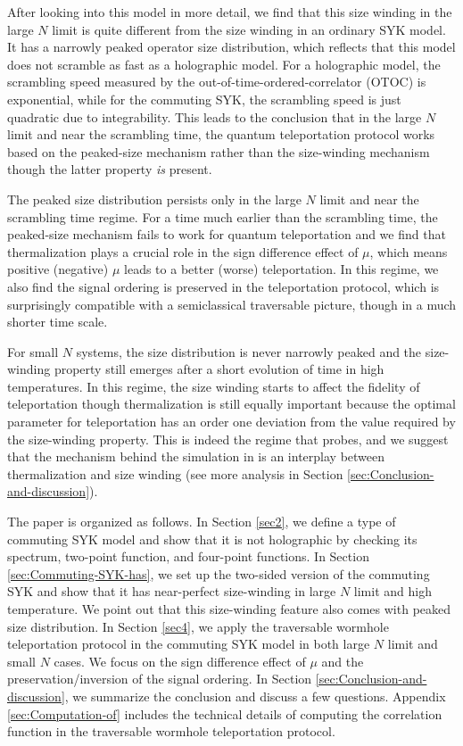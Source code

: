 \documentclass[11pt]{article}
\renewcommand{\>}{\rangle}
\newcommand{\<}{\langle}
\begin{document}
After looking into this model in more detail, we find that this size winding in the large $N$ limit is quite different from the size winding in an ordinary SYK model. It has a narrowly peaked operator size distribution, which reflects that this model does not scramble as fast as a holographic model. For a holographic model, the scrambling speed measured by the out-of-time-ordered-correlator (OTOC) is exponential, while for the commuting SYK, the scrambling speed is just quadratic due to integrability. This leads to the conclusion that in the large $N$ limit and near the scrambling time, the quantum teleportation protocol works based on the peaked-size mechanism \cite{Schuster:2021uvg} rather than the size-winding mechanism though the latter property {\it is} present. 

The peaked size distribution persists only in the large $N$ limit and near the scrambling time regime. For a time much earlier than the scrambling time, the peaked-size mechanism fails to work for quantum teleportation and we find that thermalization plays a crucial role in the sign difference effect of $\mu$, which means positive (negative) $\mu$ leads to a better (worse) 
 teleportation. In this regime, we also find the signal ordering is preserved in the teleportation protocol, which is surprisingly compatible with a semiclassical traversable picture, though in a much shorter time scale.
 
 For small $N$ systems, the size distribution is never narrowly peaked and the size-winding property still emerges after a short evolution of time in high temperatures. In this regime, the size winding starts to affect the fidelity of teleportation though thermalization is still equally important because the optimal parameter for teleportation has an order one deviation from the value required by the size-winding property. This is indeed the regime that \cite{Jafferis:2022crx} probes, and we suggest that the mechanism behind the simulation in \cite{Jafferis:2022crx} is an interplay between thermalization and size winding (see more analysis in Section \ref{sec:Conclusion-and-discussion}).

The paper is organized as follows. In Section \ref{sec2}, we define a type of commuting SYK model and show that it is not holographic by checking its spectrum, two-point function, and four-point functions. In Section \ref{sec:Commuting-SYK-has}, we set up the two-sided version of the commuting SYK and show that it has near-perfect size-winding in large $N$ limit and high temperature. We point out that this size-winding feature also comes with peaked size distribution. In Section \ref{sec4}, we apply the traversable wormhole teleportation protocol in the commuting SYK model in both large $N$ limit and small $N$ cases. We focus on the sign difference effect of $\mu$ and the preservation/inversion of the signal ordering. In Section  \ref{sec:Conclusion-and-discussion}, we summarize the conclusion and discuss a few questions. Appendix \ref{sec:Computation-of} includes the technical details of computing the correlation function in the traversable wormhole teleportation protocol.
\end{document}
